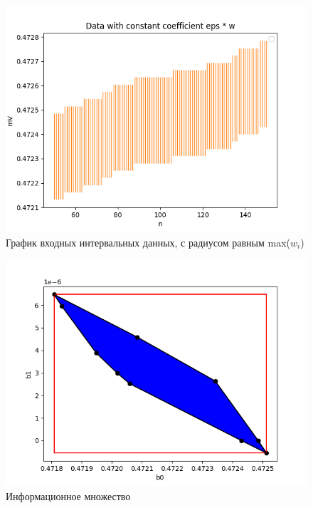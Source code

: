 \documentclass[a4paper,12pt]{article}
\begin{document}
\begin{figure}[H]
    \centering
    \includegraphics[width=15cm]{pics/max_w.png}
    \caption{График входных интервальных данных, с радиусом равным max($w_i$)}
    \label{fig:max_w}
\end{figure}

\begin{figure}[H]
    \centering
    \includegraphics[width=12cm]{pics/I.png}
    \caption{Информационное множество}
    \label{fig:I}
\end{figure}
\end{document}
